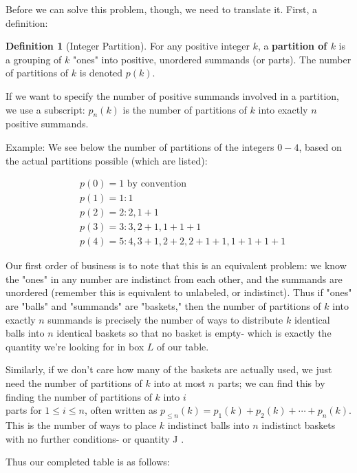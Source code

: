\documentclass{article}
\theoremstyle{definition}
\newtheorem{definition}{Definition}
\begin{document}
Before we can solve this problem, though, we need to translate it. First, a definition:

\begin{definition}[Integer Partition]
For any positive integer $k$, a \textbf{partition of $k$} is a grouping of $k$ "ones" into positive, unordered summands (or parts). The number of partitions of $k$ is denoted $p(k)$.
\end{definition}

If we want to specify the number of positive summands involved in a partition, we use a subscript: $p_{n}(k)$ is the number of partitions of $k$ into exactly $n$ positive summands.

Example: We see below the number of partitions of the integers $0-4$, based on the actual partitions possible (which are listed):

$$
\begin{aligned}
& p(0)=1 \text { by convention } \\
& p(1)=1: 1 \\
& p(2)=2: 2,1+1 \\
& p(3)=3: 3,2+1,1+1+1 \\
& p(4)=5: 4,3+1,2+2,2+1+1,1+1+1+1
\end{aligned}
$$

Our first order of business is to note that this is an equivalent problem: we know the "ones" in any number are indistinct from each other, and the summands are unordered (remember this is equivalent to unlabeled, or indistinct). Thus if "ones" are "balls" and "summands" are "baskets," then the number of partitions of $k$ into exactly $n$ summands is precisely the number of ways to distribute $k$ identical balls into $n$ identical baskets so that no basket is empty- which is exactly the quantity we're looking for in box $L$ of our table.

Similarly, if we don't care how many of the baskets are actually used, we just need the number of partitions of $k$ into at most $n$ parts; we can find this by finding the number of partitions of $k$ into $i$\\
parts for $1 \leq i \leq n$, often written as $p_{\leq n}(k)=p_{1}(k)+p_{2}(k)+\cdots+p_{n}(k)$. This is the number of ways to place $k$ indistinct balls into $n$ indistinct baskets with no further conditions- or quantity J .

Thus our completed table is as follows:
\end{document}
